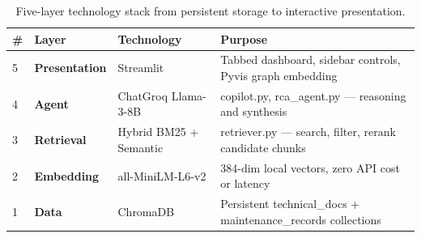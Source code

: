 \documentclass[12pt,a4paper]{article}
\begin{document}
\begin{table}[htbp]
\centering
\caption{Five-layer technology stack from persistent storage to interactive presentation.}
\label{fig:techstack}
\renewcommand{\arraystretch}{1.5}
\begin{tabular}{>{}p{0.4cm} p{3.2cm} p{4.0cm} p{5.6cm}}
\toprule
\textbf{\#} & \textbf{Layer} & \textbf{Technology} & \textbf{Purpose} \\
\midrule
5 & \textcolor{primaryblue}{\textbf{Presentation}} & Streamlit & Tabbed dashboard, sidebar controls, Pyvis graph embedding \\
4 & \textcolor{primarypurple}{\textbf{Agent}} & ChatGroq Llama-3-8B & copilot.py, rca\_agent.py — reasoning and synthesis \\
3 & \textcolor{codered}{\textbf{Retrieval}} & Hybrid BM25 + Semantic & retriever.py — search, filter, rerank candidate chunks \\
2 & \textcolor{accentgray}{\textbf{Embedding}} & all-MiniLM-L6-v2 & 384-dim local vectors, zero API cost or latency \\
1 & \textcolor{primarygreen}{\textbf{Data}} & ChromaDB & Persistent technical\_docs + maintenance\_records collections \\
\bottomrule
\end{tabular}
\renewcommand{\arraystretch}{1}
\end{table}
\end{document}
